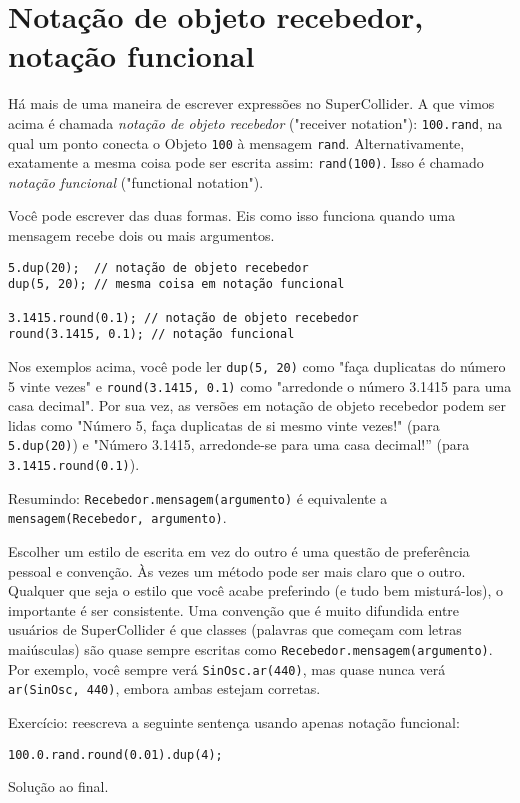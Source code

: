 \section{Notação de objeto recebedor, notação funcional}


Há mais de uma maneira de escrever expressões no SuperCollider. A que vimos acima é chamada \emph{notação de objeto recebedor} ("receiver notation"): \texttt{100.rand}, na qual um ponto conecta o Objeto \texttt{100} à mensagem \texttt{rand}. Alternativamente, exatamente a mesma coisa pode ser escrita assim: \texttt{rand(100)}. Isso é chamado \emph{notação funcional} ("functional notation").

Você pode escrever das duas formas. Eis  como isso funciona quando uma mensagem recebe dois ou mais argumentos.

 
\begin{lstlisting}[style=SuperCollider-IDE, basicstyle=\scttfamily\footnotesize]
5.dup(20);  // notação de objeto recebedor
dup(5, 20); // mesma coisa em notação funcional

3.1415.round(0.1); // notação de objeto recebedor
round(3.1415, 0.1); // notação funcional
\end{lstlisting}
 

Nos exemplos acima, você pode ler \texttt{dup(5, 20)} como "faça duplicatas do número 5 vinte vezes" e \texttt{round(3.1415, 0.1)} como "arredonde o número 3.1415 para uma casa decimal". Por sua vez, as versões em notação de objeto recebedor podem ser lidas como "Número 5, faça duplicatas de si mesmo vinte vezes!" (para \texttt{5.dup(20)}) e "Número 3.1415, arredonde-se para uma casa decimal!'' (para \texttt{3.1415.round(0.1)}).

Resumindo: \texttt{Recebedor.mensagem(argumento)} é equivalente a \texttt{mensagem(Recebedor, argumento)}.

Escolher um estilo de escrita em vez do outro é uma questão de preferência pessoal e convenção. Às vezes um método pode ser mais claro que o outro. Qualquer que seja o estilo que você acabe preferindo (e tudo bem misturá-los), o importante é ser consistente. Uma convenção que é muito difundida entre usuários de SuperCollider é que classes (palavras que começam com letras maiúsculas) são quase sempre escritas como \texttt{Recebedor.mensagem(argumento)}. Por exemplo, você sempre verá \texttt{SinOsc.ar(440)}, mas quase nunca verá \texttt{ar(SinOsc, 440)}, embora ambas estejam corretas.

Exercício: reescreva a seguinte sentença usando apenas notação funcional:

\texttt{100.0.rand.round(0.01).dup(4);} 

Solução ao final.

